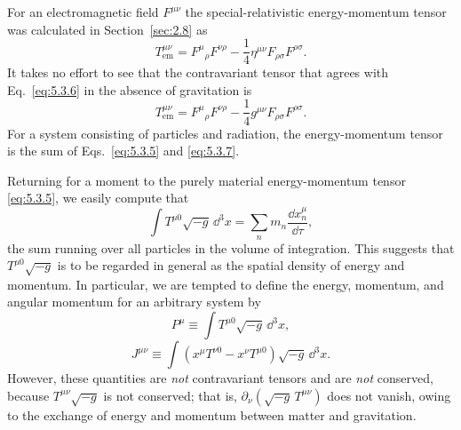 For an electromagnetic field \(F^{\mu\nu}\) the special-relativistic
energy-momentum tensor was calculated in Section~\ref{sec:2.8} as
\begin{equation}
  T^{\mu\nu}_{\mathrm{em}}
  =
  F^\mu{}_\rho F^{\nu\rho}
  -
  \frac14\eta^{\mu\nu}F_{\rho\sigma}F^{\rho\sigma}.
  \tag{5.3.6}\label{eq:5.3.6}
\end{equation}
It takes no effort to see that the contravariant tensor that agrees with
Eq.~\eqref{eq:5.3.6} in the absence of gravitation is
\begin{equation}
  T^{\mu\nu}_{\mathrm{em}}
  =
  F^\mu{}_\rho F^{\nu\rho}
  -
  \frac14 g^{\mu\nu}F_{\rho\sigma}F^{\rho\sigma}.
  \tag{5.3.7}\label{eq:5.3.7}
\end{equation}
For a system consisting of particles and radiation, the energy-momentum
tensor is the sum of Eqs.~\eqref{eq:5.3.5} and \eqref{eq:5.3.7}.

Returning for a moment to the purely material energy-momentum tensor
\eqref{eq:5.3.5}, we easily compute that
\[
  \int
  T^{\mu0}\sqrt{-g}\,\dd^3x
  =
  \sum_n m_n\frac{\dd x_n^\mu}{\dd\tau},
\]
the sum running over all particles in the volume of integration. This
suggests that \(T^{\mu0}\sqrt{-g}\) is to be regarded in general as the
spatial density of energy and momentum. In particular, we are tempted to
define the energy, momentum, and angular momentum for an arbitrary system by
\begin{equation}
  P^\mu
  \equiv
  \int
  T^{\mu0}\sqrt{-g}\,\dd^3x,
  \tag{5.3.8}\label{eq:5.3.8}
\end{equation}
\begin{equation}
  J^{\mu\nu}
  \equiv
  \int
  \left(
    x^\mu T^{\nu0}
    -
    x^\nu T^{\mu0}
  \right)
  \sqrt{-g}\,\dd^3x.
  \tag{5.3.9}\label{eq:5.3.9}
\end{equation}
However, these quantities are \emph{not} contravariant tensors and are
\emph{not} conserved, because \(T^{\mu\nu}\sqrt{-g}\) is not conserved;
that is, \(\partial_\nu(\sqrt{-g}\,T^{\mu\nu})\) does not vanish, owing to
the exchange of energy and momentum between matter and gravitation.

